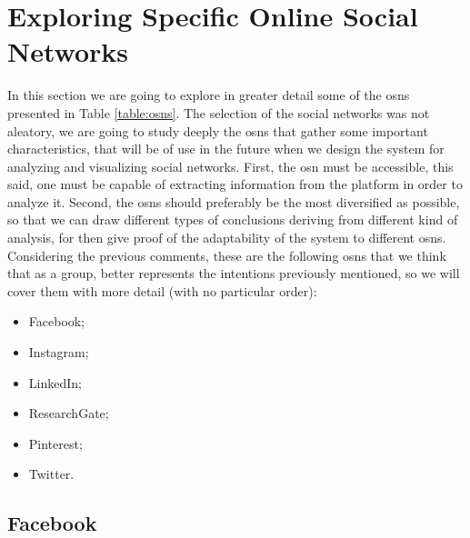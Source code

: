 \section{Exploring Specific Online Social Networks}

In this section we are going to explore in greater detail some of the \glspl{osn} presented
in Table \ref{table:osns}. The selection of the social networks was not aleatory, we are going
to study deeply the \glspl{osn} that gather some important characteristics, that will be of use in
the future when we design the system for analyzing and visualizing social networks. First, the
\gls{osn} must be accessible, this said, one must be capable of extracting information from the platform
in order to analyze it. Second, the \glspl{osn} should preferably be the most diversified as possible, so that we
can draw different types of conclusions deriving from different kind of analysis, for then give proof
of the adaptability of the system to different \glspl{osn}. Considering the previous
comments, these are the following \glspl{osn} that we think that as a group, better represents the intentions
previously mentioned, so we will cover them with more detail (with no particular order):
\begin{itemize}
  \item Facebook;
  \item Instagram;
  \item LinkedIn;
  \item ResearchGate;
  \item Pinterest;
  \item Twitter.
\end{itemize}

\subsection{Facebook}

